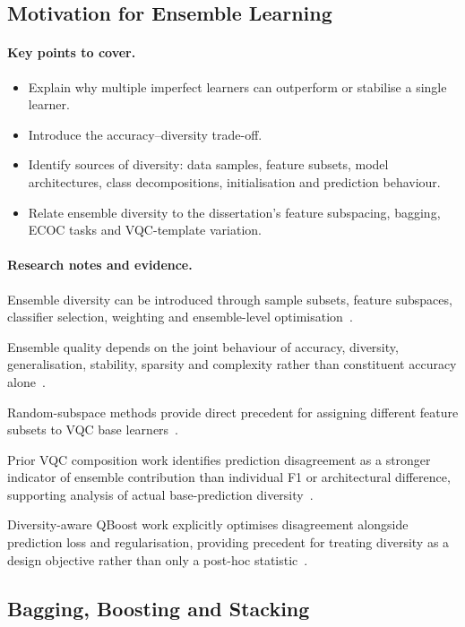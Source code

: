 \documentclass[]{UCD_CS_MSc_AAI_Report}
\newcommand{\method}[1]{{\color{cyan!80!black}#1}}
\newcommand{\result}[1]{{\color{green!60!black}#1}}
\newcommand{\comparison}[1]{{\color{pink!70!violet}#1}}
\newcommand{\sectionbrief}{\paragraph{Key points to cover.}}
\newcommand{\researchnotes}{\paragraph{Research notes and evidence.}}
\begin{document}
\subsection{Motivation for Ensemble Learning}

\sectionbrief
\begin{itemize}
    \item Explain why multiple imperfect learners can outperform or stabilise a single learner.
    \item Introduce the accuracy--diversity trade-off.
    \item Identify sources of diversity: data samples, feature subsets, model architectures, class decompositions, initialisation and prediction behaviour.
    \item Relate ensemble diversity to the dissertation's feature subspacing, bagging, ECOC tasks and VQC-template variation.
\end{itemize}

\researchnotes
\begin{itemize}
    \method{\item Ensemble diversity can be introduced through sample subsets, feature subspaces, classifier selection, weighting and ensemble-level optimisation~\cite{dong_survey_2020}.}
    \comparison{\item Ensemble quality depends on the joint behaviour of accuracy, diversity, generalisation, stability, sparsity and complexity rather than constituent accuracy alone~\cite{dong_survey_2020}.}
    \method{\item Random-subspace methods provide direct precedent for assigning different feature subsets to VQC base learners~\cite{dong_survey_2020,radojicic_reducing_2026}.}
    \result{\item Prior VQC composition work identifies prediction disagreement as a stronger indicator of ensemble contribution than individual F1 or architectural difference, supporting analysis of actual base-prediction diversity~\cite{pinto_composing_2026}.}
    \method{\item Diversity-aware QBoost work explicitly optimises disagreement alongside prediction loss and regularisation, providing precedent for treating diversity as a design objective rather than only a post-hoc statistic~\cite{liu_construction_2025}.}
\end{itemize}

\subsection{Bagging, Boosting and Stacking}
\end{document}
